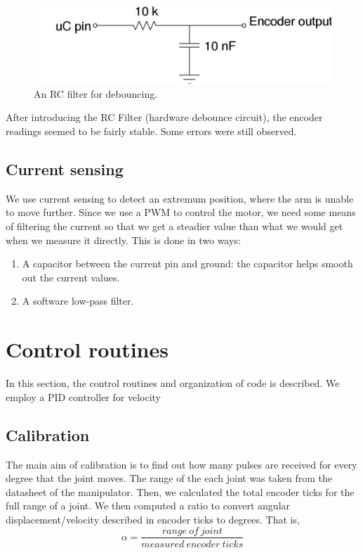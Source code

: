 \documentclass[10pt,a4paper]{article}
\begin{document}
\begin{figure}[h]
    \centering
    \includegraphics[scale=0.5]{debouncer.jpg}
    \caption{An RC filter for debouncing.}
    \label{fig:rcfilter}
\end{figure}

After introducing the RC Filter (hardware debounce circuit), the
encoder readings seemed to be fairly stable. Some errors were still
observed. 

\subsection{Current sensing}
We use current sensing to detect an extremum position, where the arm
is unable to move further. Since we use a PWM to control the motor, we
need some means of filtering the current so that we get a steadier
value than what we would get when we measure it directly. This is done
in two ways: 
\begin{enumerate}
\item A capacitor between the current pin and ground: the capacitor
  helps smooth out the current values.
\item A software low-pass filter.
\end{enumerate}

\section{Control routines}

In this section, the control routines and organization of code is
described. We employ a PID controller for velocity 

\subsection{Calibration}

The main aim of calibration is to find out how many pulses are
received for every degree that the joint moves. The range of the each
joint was taken from the datasheet of the manipulator. Then, we
calculated the total encoder ticks for the full range of a joint. We
then computed a ratio to convert angular displacement/velocity
described in encoder ticks to degrees. That is,
\[ \alpha = \frac{range\ of\ joint}{measured\ encoder\ ticks}\]
\end{document}
